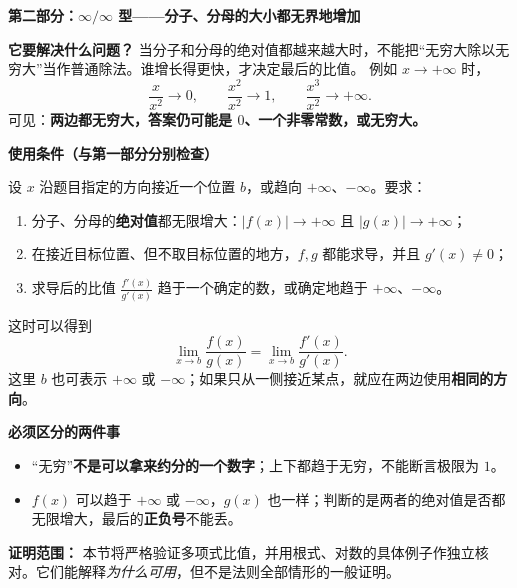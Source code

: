 \clearpage
\begin{statementbox}
\textbf{\textcolor{CStatement}{第二部分：$\infty/\infty$ 型——分子、分母的大小都无界地增加}}

\textbf{它要解决什么问题？} 当分子和分母的绝对值都越来越大时，不能把“无穷大除以无穷大”当作普通除法。谁增长得更快，才决定最后的比值。
例如 $x\to+\infty$ 时，
\[
 \frac{x}{x^2}\to0,\qquad \frac{x^2}{x^2}\to1,\qquad \frac{x^3}{x^2}\to+\infty.
\]
可见：\textbf{两边都无穷大，答案仍可能是 $0$、一个非零常数，或无穷大。}

\medskip
\textbf{\textcolor{CStatement}{使用条件（与第一部分分别检查）}}

设 $x$ 沿题目指定的方向接近一个位置 $b$，或趋向 $+\infty$、$-\infty$。要求：
\begin{enumerate}[leftmargin=*, itemsep=0.28em, topsep=0.28em]
\item 分子、分母的\textbf{绝对值}都无限增大：$|f(x)|\to+\infty$ 且 $|g(x)|\to+\infty$；
\item 在接近目标位置、但不取目标位置的地方，$f,g$ 都能求导，并且 $g'(x)\ne0$；
\item 求导后的比值 $\frac{f'(x)}{g'(x)}$ 趋于一个确定的数，或确定地趋于 $+\infty$、$-\infty$。
\end{enumerate}
这时可以得到
\[
\boxed{\displaystyle
\lim_{x\to b}\frac{f(x)}{g(x)}
=\lim_{x\to b}\frac{f'(x)}{g'(x)}.}
\]
这里 $b$ 也可表示 $+\infty$ 或 $-\infty$；如果只从一侧接近某点，就应在两边使用\textbf{相同的方向}。

\medskip
\textbf{\textcolor{CStatement}{必须区分的两件事}}

\begin{itemize}[leftmargin=*, itemsep=0.25em]
\item “无穷”\textbf{不是可以拿来约分的一个数字}；上下都趋于无穷，不能断言极限为 $1$。
\item $f(x)$ 可以趋于 $+\infty$ 或 $-\infty$，$g(x)$ 也一样；判断的是两者的绝对值是否都无限增大，最后的\textbf{正负号}不能丢。
\end{itemize}

\textbf{证明范围：} 本节将严格验证多项式比值，并用根式、对数的具体例子作独立核对。它们能解释\emph{为什么可用}，但不是法则全部情形的一般证明。
\end{statementbox}
